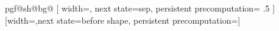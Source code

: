 {{    \pgfmathdivide@{\pgfmath@tonumber{\pgf@ya}}{\pgfmath@tonumber{\pgf@yb}}%
    \expandafter\pgftransformyscale\expandafter{\pgfmathresult}%
    \pgf@lib@shapedecoration@points%
    \pgf@lib@shapedecoration@macros%
    \csname pgf@sh@bg@\endcsname%
  }%
  [
    width=\pgf@lib@shapedecoration@aftershape-1sp,
    next state=sep,
    persistent precomputation=
    {
      \ifpgf@lib@shapedecoration@betweenborders%
        \pgf@x\pgf@lib@shapedecoration@width\relax%
        \pgf@x.5\pgf@x%
        \edef\pgf@lib@shapedecoration@aftershape{\the\pgf@x}%
      \else%
        \edef\pgf@lib@shapedecoration@aftershape{0pt}%
      \fi%
    }
  ]
  {}%
  [width=\pgf@lib@shapedecoration@sep,next state=before shape,
              persistent precomputation=\def\pgf@lib@shapedecoration@beforeshape{0pt}]
  {}%
  {
    \pgfpathmoveto{\pgfpointdecoratedpathlast}%
  }%
}%

\def\pgf@lib@shapedecoration@setkeyword,{%
  \pgfutil@ifnextchar\pgf@stop{\def\pgf@temp{}\pgf@lib@@@shapedecoration@setkeyword}{\pgf@lib@@shapedecoration@setkeyword}%
}%
\def\pgf@lib@@shapedecoration@setkeyword#1,{\def\pgf@temp{#1}\pgf@lib@@@shapedecoration@setkeyword}%
\def\pgf@lib@@@shapedecoration@setkeyword\pgf@stop{%
  \ifx\pgf@temp\pgf@lib@shapedecoration@borderstext%
    \pgf@lib@shapedecoration@betweenborderstrue%
  \else%
    \pgf@lib@shapedecoration@betweenbordersfalse%
  \fi%
}%



\endinput
